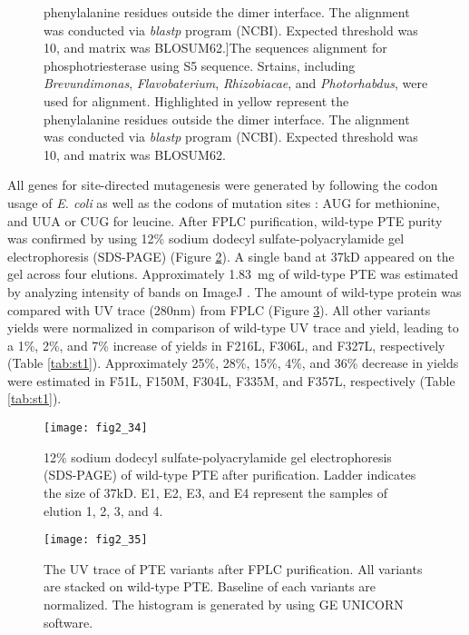 \begin{refsection}
\begin{figure}[htbp]
        phenylalanine residues outside the dimer interface. The alignment was
        conducted via \emph{blastp} program (NCBI). Expected threshold was 10,
    and matrix was BLOSUM62.]{The sequences alignment for phosphotriesterase
        using S5 sequence.\cite{Roodveldt2005} Srtains, including
        \emph{Brevundimonas}, \emph{Flavobaterium}, \emph{Rhizobiacae}, and
        \emph{Photorhabdus}, were used for alignment. Highlighted in yellow
        represent the phenylalanine residues outside the dimer interface. The
        alignment was conducted via \emph{blastp} program (NCBI). Expected
    threshold was 10, and matrix was BLOSUM62.}
    \label{fig:pte-alignment}
\end{figure}

All genes for site-directed mutagenesis were generated by following the codon
usage of \emph{E. coli} as well as the codons of mutation sites
\cite{Sivashanmugam2009b}: AUG for methionine, and UUA or CUG for leucine.
After FPLC purification, wild-type PTE purity was confirmed by using
12\% sodium dodecyl sulfate-polyacrylamide gel electrophoresis (SDS-PAGE)
(Figure \ref{fig:gel}). A single band at 37kD appeared on the gel
across four elutions. Approximately \SI{1.83}{\mg} of wild-type PTE was estimated
by analyzing intensity of bands on ImageJ \cite{Abramoff2004}. The amount of
wild-type protein was compared with UV trace (280nm) from FPLC (Figure
\ref{fig:yield-estimate}). All other variants yields were normalized in
comparison of wild-type UV trace and yield, leading to a 1\%, 2\%, and 7\%
increase of yields in F216L, F306L, and F327L, respectively (Table
\ref{tab:st1}). Approximately 25\%, 28\%, 15\%, 4\%, and 36\% decrease in
yields were estimated in F51L, F150M, F304L, F335M, and F357L, respectively
(Table \ref{tab:st1}). 
\begin{figure}[htbp] \centering \texttt{[image: fig2\_34]}
    \caption[12\% sodium dodecyl sulfate-polyacrylamide gel electrophoresis
    (SDS-PAGE) of wild-type PTE after purification. Ladder indicates the size
of 37kD. E1, E2, E3, and E4 represent the samples of elution 1, 2, 3, and
4.]{12\% sodium dodecyl sulfate-polyacrylamide gel electrophoresis (SDS-PAGE)
of wild-type PTE after purification. Ladder indicates the size of 37kD. E1, E2,
E3, and E4 represent the samples of elution 1, 2, 3, and 4.}
\label{fig:gel}
\end{figure}
\begin{figure}[htbp] \centering \texttt{[image: fig2\_35]}
    \caption[The UV trace of PTE variants after FPLC purification. All variants
    are stacked on wild-type PTE. Baseline of each variants are normalized. The
histogram is generated by using GE UNICORN software.]{The UV trace of PTE
    variants after FPLC purification. All variants are stacked on wild-type
    PTE. Baseline of each variants are normalized. The histogram is generated
by using GE UNICORN software.}
\label{fig:yield-estimate}
\end{figure}


\end{refsection}
